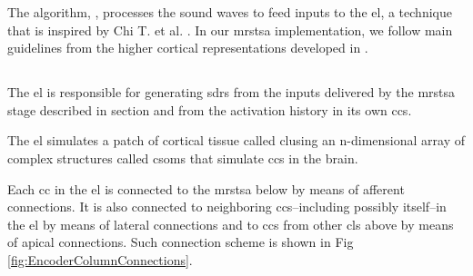 \documentclass[10pt,letterpaper]{article}
\begin{document}

The algorithm, , processes the sound waves to feed inputs to the \gls{el}, a technique that is inspired by Chi T. et al. \cite{chi_2005}.
In our \gls{mrstsa} implementation, we follow main guidelines from the higher cortical representations
developed in \cite{chi_2005}.



\subsection*{}

The \gls{el} is responsible for generating \glspl{sdr} from the inputs delivered by the \gls{mrstsa} stage
described in section  and from the activation history in its own \glspl{cc}.

The \gls{el} simulates a patch of cortical tissue called \gls{cl}using an n-dimensional array of complex structures called \glspl{csom} that simulate \glspl{cc} in the brain.

Each \gls{cc} in the \gls{el} is connected to the \gls{mrstsa} below by means of afferent connections. It is also
connected to neighboring \glspl{cc}--including possibly itself--in the \gls{el} by means of lateral connections and
to \glspl{cc} from other \glspl{cl} above by means of apical connections. Such connection scheme is shown in Fig \ref{fig:EncoderColumnConnections}.
\end{document}
